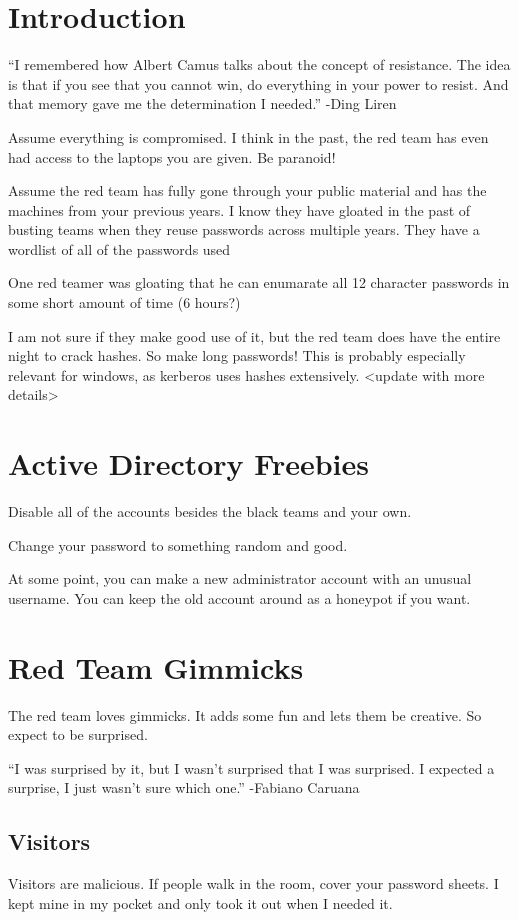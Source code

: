 \documentclass{article}
\begin{document}
\graphicspath{ {./Images/} }
\tableofcontents

\section{Introduction}
“I remembered how Albert Camus talks about the concept of resistance. 
The idea is that if you see that you cannot win, do everything in your power to resist. And that memory gave me the determination I needed.”
-Ding Liren

Assume everything is compromised. I think in the past, the red team has even had access to the laptops you are given. Be paranoid!

Assume the red team has fully gone through your public material and has the machines from your previous years.
I know they have gloated in the past of busting teams when they reuse passwords across multiple years.
They have a wordlist of all of the passwords used 

One red teamer was gloating that he can enumarate all 12 character passwords in some short amount of time (6 hours?)

I am not sure if they make good use of it, but the red team does have the entire night to crack hashes. So make long passwords!
This is probably especially relevant for windows, as kerberos uses hashes extensively. <update with more details>

\section{Active Directory Freebies}
Disable all of the accounts besides the black teams and your own.

Change your password to something random and good. 

At some point, you can make a new administrator account with an unusual username. You can keep the old account around as a honeypot if you want.

\section{Red Team Gimmicks}
The red team loves gimmicks. It adds some fun and lets them be creative. So expect to be surprised.

“I was surprised by it, but I wasn’t surprised that I was surprised. I expected a surprise, I just wasn’t sure which one.” -Fabiano Caruana

\subsection{Visitors}
Visitors are malicious.
If people walk in the room, cover your password sheets. I kept mine in my pocket and only took it out when I needed it. 
\end{document}
